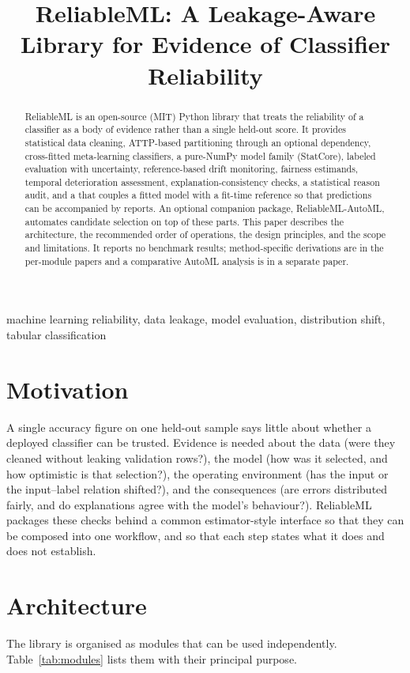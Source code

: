 \documentclass[conference]{IEEEtran}
\title{ReliableML: A Leakage-Aware Library for Evidence of Classifier Reliability}
\author{\jabulaniauthor\and\martinchanzauthor\and\oloratoauthor\and\mfundoauthor}
\begin{document}
\maketitle
\begin{abstract}
ReliableML is an open-source (MIT) Python library that treats the reliability of a classifier as a body of evidence rather than a single held-out score. It provides statistical data cleaning, ATTP-based partitioning through an optional dependency, cross-fitted meta-learning classifiers, a pure-NumPy model family (StatCore), labeled evaluation with uncertainty, reference-based drift monitoring, fairness estimands, temporal deterioration assessment, explanation-consistency checks, a statistical reason audit, and a  that couples a fitted model with a fit-time reference so that predictions can be accompanied by reports. An optional companion package, ReliableML-AutoML, automates candidate selection on top of these parts. This paper describes the architecture, the recommended order of operations, the design principles, and the scope and limitations. It reports no benchmark results; method-specific derivations are in the per-module papers and a comparative AutoML analysis is in a separate paper.
\end{abstract}
\begin{IEEEkeywords}
machine learning reliability, data leakage, model evaluation, distribution shift, tabular classification
\end{IEEEkeywords}

\section{Motivation}
A single accuracy figure on one held-out sample says little about whether a deployed classifier can be trusted. Evidence is needed about the data (were they cleaned without leaking validation rows?), the model (how was it selected, and how optimistic is that selection?), the operating environment (has the input or the input--label relation shifted?), and the consequences (are errors distributed fairly, and do explanations agree with the model's behaviour?). ReliableML packages these checks behind a common estimator-style interface so that they can be composed into one workflow, and so that each step states what it does and does not establish.

\section{Architecture}
The library is organised as modules that can be used independently. Table~\ref{tab:modules} lists them with their principal purpose.
\end{document}
